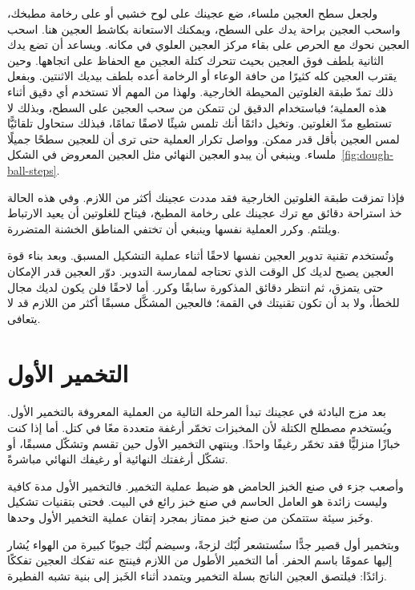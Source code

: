 ولجعل سطح العجين ملساء، ضع عجينك على لوح خشبي أو على رخامة مطبخك، واسحب العجين براحة يدك على السطح، ويمكنك الاستعانة بكاشط العجين هنا. اسحب العجين نحوك مع الحرص على بقاء مركز العجين العلوي في مكانه. ويساعد أن تضع يدك الثانية بلطف فوق العجين بحيث تتحرك كتلة العجين مع الحفاظ على اتجاهها. وحين يقترب العجين كله كثيرًا من حافة الوعاء أو الرخامة أعده بلطف بيديك الاثنتين. وبفعل ذلك تمدّ طبقة الغلوتين المحيطة الخارجية. ولهذا من المهم ألا تستخدم أي دقيق أثناء هذه العملية؛ فباستخدام الدقيق لن تتمكن من سحب العجين على السطح، وبذلك لا تستطيع مدّ الغلوتين. وتخيل دائمًا أنك تلمس شيئًا لاصقًا تمامًا، فبذلك ستحاول تلقائيًّا لمس العجين بأقل قدر ممكن. وواصل تكرار العملية حتى ترى أن للعجين سطحًا جميلًا ملساء. وينبغي أن يبدو العجين النهائي مثل العجين المعروض في الشكل~\ref{fig:dough-ball-steps}.

فإذا تمزقت طبقة الغلوتين الخارجية فقد مددت عجينك أكثر من اللازم. وفي هذه الحالة خذ استراحة  دقائق مع ترك عجينك على رخامة المطبخ، فيتاح للغلوتين أن يعيد الارتباط ويلتئم. وكرر العملية نفسها وينبغي أن تختفي المناطق الخشنة المتضررة.

وتُستخدم تقنية تدوير العجين نفسها لاحقًا أثناء عملية التشكيل المسبق. وبعد بناء قوة العجين يصبح لديك كل الوقت الذي تحتاجه لممارسة التدوير. دوّر العجين قدر الإمكان حتى يتمزق، ثم انتظر  دقائق المذكورة سابقًا وكرر. أما لاحقًا فلن يكون لديك مجال للخطأ، ولا بد أن تكون تقنيتك في القمة؛ فالعجين المشكَّل مسبقًا أكثر من اللازم قد لا يتعافى.

\section{التخمير الأول}
\label{sec:bulk-fermentation}

بعد مزج البادئة في عجينك تبدأ المرحلة التالية من العملية المعروفة بالتخمير الأول. ويُستخدم مصطلح الكتلة لأن المخبزات تخمّر أرغفة متعددة معًا في كتل. أما إذا كنت خبازًا منزليًّا فقد تخمّر رغيفًا واحدًا. وينتهي التخمير الأول حين تقسم وتشكّل مسبقًا، أو تشكّل أرغفتك النهائية أو رغيفك النهائي مباشرةً.

وأصعب جزء في صنع الخبز الحامض هو ضبط عملية التخمير. فالتخمير الأول مدة كافية وليست زائدة هو العامل الحاسم في صنع خبز رائع في البيت. فحتى بتقنيات تشكيل وخَبز سيئة ستتمكن من صنع خبز ممتاز بمجرد إتقان عملية التخمير الأول وحدها.

وبتخمير أول قصير جدًّا ستُستشعر لُبّك لزجةً، وسيضم لُبّك جيوبًا كبيرة من الهواء يُشار إليها عمومًا باسم الحفر. أما التخمير الأطول من اللازم فينتج عنه تفكك العجين تفككًا زائدًا: فيلتصق العجين الناتج بسلة التخمير ويتمدد أثناء الخَبز إلى بنية تشبه الفطيرة.

